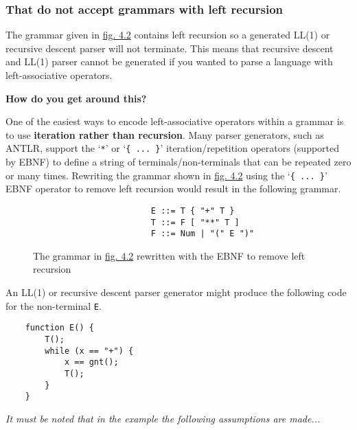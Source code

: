 \subsubsection{That do not accept grammars with left recursion}

The grammar given in \hyperref[fig:4.2]{fig. 4.2} contains left recursion so a generated LL(1) or recursive descent parser will not terminate. This means that recursive descent and LL(1) parser cannot be generated if you wanted to parse a language with left-associative operators.

\begin{center}
    \textbf{How do you get around this?}
\end{center}

One of the easiest ways to encode left-associative operators within a grammar is to use \textbf{iteration rather than recursion}. Many parser generators, such as ANTLR, support the `\verb|*|' or `\verb|{ ... }|' iteration/repetition operators (supported by EBNF) to define a string of terminals/non-terminals that can be repeated zero or many times. Rewriting the grammar shown in \hyperref[fig:4.2]{fig. 4.2} using the `\verb|{ ... }|' EBNF operator to remove left recursion would result in the following grammar.\textsuperscript{\cite{pattis_2021}}

\begin{figure}[H]
    \begin{center}
        \begin{verbatim}
                        E ::= T { "+" T }
                        T ::= F [ "**" T ]
                        F ::= Num | "(" E ")"
        \end{verbatim}
    \end{center}
    \vspace{-1.5em}
    \caption{\label{fig:4.3}The grammar in \hyperref[fig:4.2]{fig. 4.2} rewritten with the EBNF to remove left recursion}
\end{figure}

\pagebreak

An LL(1) or recursive descent parser generator might produce the following code for the non-terminal \verb|E|.

\begin{verbatim}
    function E() {
        T();
        while (x == "+") {
            x == gnt();
            T();
        }
    }
\end{verbatim}

\textit{It must be noted that in the example the following assumptions are made...}

